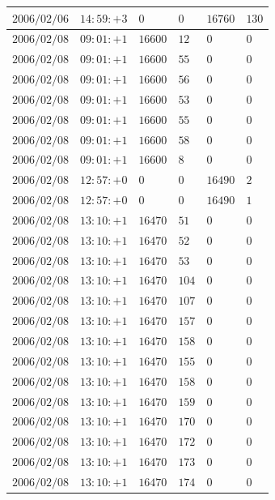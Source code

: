 \documentclass[a4j,papersize,disablejfam,slide,14pt]{jsarticle}
\begin{document}
\begin{description}
\begin{center}
\begin{longtable}{|l|l|l|l|l|l|}
					$2006/02/06$ & $14:59:+3$  & $0$ & $0$ & $16760$ & $130$ \\ \hline
					$2006/02/08$ & $09:01:+1$  & $16600$ & $12$ & $0$ & $0$ \\ \hline
					$2006/02/08$ & $09:01:+1$  & $16600$ & $55$ & $0$ & $0$ \\ \hline
					$2006/02/08$ & $09:01:+1$  & $16600$ & $56$ & $0$ & $0$ \\ \hline
					$2006/02/08$ & $09:01:+1$  & $16600$ & $53$ & $0$ & $0$ \\ \hline
					$2006/02/08$ & $09:01:+1$  & $16600$ & $55$ & $0$ & $0$ \\ \hline
					$2006/02/08$ & $09:01:+1$  & $16600$ & $58$ & $0$ & $0$ \\ \hline
					$2006/02/08$ & $09:01:+1$  & $16600$ & $8$ & $0$ & $0$ \\ \hline
					$2006/02/08$ & $12:57:+0$  & $0$ & $0$ & $16490$ & $2$ \\ \hline
					$2006/02/08$ & $12:57:+0$  & $0$ & $0$ & $16490$ & $1$ \\ \hline
					$2006/02/08$ & $13:10:+1$  & $16470$ & $51$ & $0$ & $0$ \\ \hline
					$2006/02/08$ & $13:10:+1$  & $16470$ & $52$ & $0$ & $0$ \\ \hline
					$2006/02/08$ & $13:10:+1$  & $16470$ & $53$ & $0$ & $0$ \\ \hline
					$2006/02/08$ & $13:10:+1$  & $16470$ & $104$ & $0$ & $0$ \\ \hline
					$2006/02/08$ & $13:10:+1$  & $16470$ & $107$ & $0$ & $0$ \\ \hline
					$2006/02/08$ & $13:10:+1$  & $16470$ & $157$ & $0$ & $0$ \\ \hline
					$2006/02/08$ & $13:10:+1$  & $16470$ & $158$ & $0$ & $0$ \\ \hline
					$2006/02/08$ & $13:10:+1$  & $16470$ & $155$ & $0$ & $0$ \\ \hline
					$2006/02/08$ & $13:10:+1$  & $16470$ & $158$ & $0$ & $0$ \\ \hline
					$2006/02/08$ & $13:10:+1$  & $16470$ & $159$ & $0$ & $0$ \\ \hline
					$2006/02/08$ & $13:10:+1$  & $16470$ & $170$ & $0$ & $0$ \\ \hline
					$2006/02/08$ & $13:10:+1$  & $16470$ & $172$ & $0$ & $0$ \\ \hline
					$2006/02/08$ & $13:10:+1$  & $16470$ & $173$ & $0$ & $0$ \\ \hline
					$2006/02/08$ & $13:10:+1$  & $16470$ & $174$ & $0$ & $0$ \\ \hline

\end{longtable}
\end{center}
\end{description}
\end{document}
